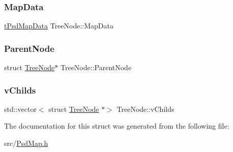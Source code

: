 \subsubsection{\texorpdfstring{Map\+Data}{MapData}}
{\footnotesize\ttfamily \hyperlink{_psd_message_decoder_8h_ad54e183dd7c544312c06d4bd6279ebdc}{t\+Psd\+Map\+Data} Tree\+Node\+::\+Map\+Data}

\mbox{\label{struct_tree_node_a2e4d7b1482b67b0be9a09ba86e225300}} 
\subsubsection{\texorpdfstring{Parent\+Node}{ParentNode}}
{\footnotesize\ttfamily struct \hyperlink{struct_tree_node}{Tree\+Node}$\ast$ Tree\+Node\+::\+Parent\+Node}

\mbox{\label{struct_tree_node_adb4d9e37e7a3b5fddbabf56ac56eccd7}} 
\subsubsection{\texorpdfstring{v\+Childs}{vChilds}}
{\footnotesize\ttfamily std\+::vector$<$ struct \hyperlink{struct_tree_node}{Tree\+Node} $\ast$$>$ Tree\+Node\+::v\+Childs}



The documentation for this struct was generated from the following file\+:\begin{DoxyCompactItemize}
\item 
src/\hyperlink{_psd_map_8h}{Psd\+Map.\+h}\end{DoxyCompactItemize}
